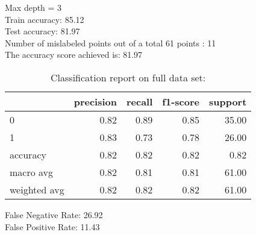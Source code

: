Max depth = 3\\
Train accuracy: 85.12%
\\Test accuracy: 81.97%
\\Number of mislabeled points out of a total 61 points : 11
\\The accuracy score achieved is: 81.97 %
\begin{table}[H]
\caption{Classification report on full data set:}
\begin{center}
\begin{tabular}{lrrrr}
\toprule
{} &  precision &  recall &  f1-score &  support \\
\midrule
0            &       0.82 &    0.89 &      0.85 &    35.00 \\
1            &       0.83 &    0.73 &      0.78 &    26.00 \\
accuracy     &       0.82 &    0.82 &      0.82 &     0.82 \\
macro avg    &       0.82 &    0.81 &      0.81 &    61.00 \\
weighted avg &       0.82 &    0.82 &      0.82 &    61.00 \\
\bottomrule
\end{tabular}

\label{decision_tree_class}
\end{center}
\end{table}
\noindent
False Negative Rate: 26.92
\\False Positive Rate: 11.43
